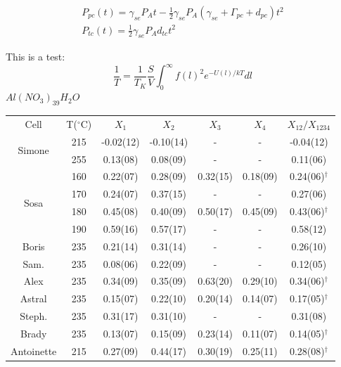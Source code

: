 \documentclass[pdftex,letterpaper,12pt]{report}
\begin{document}
	
\begin{subequations}\label{InitialSpinup}
	\begin{gather}
	P_{pc}(t)=\gamma_{se}P_{A}t-\frac{1}{2}\gamma_{se}P_{A}(\gamma_{se}+\Gamma_{pc}+d_{pc})t^{2}\\
	P_{tc}(t)=\frac{1}{2}\gamma_{se}P_{A}d_{tc}t^{2}
	\end{gather}
\end{subequations}

This is a test:
\begin{equation}
\frac{1}{T}=\frac{1}{T_K}\frac{S}{V}\int_{0}^{\infty} f\left(l\right)^2 e^{-U\left(l\right)/kT}dl
\end{equation}
$Al(NO_3)_39H_2O$

\begin{table}\scriptsize
	\captionsetup{font=scriptsize}
	\begin{center}
		\def\arraystretch{0.75}
		\setlength\tabcolsep{1pt}
		\begin{tabular}{|c|c|cccc|c|}
			\hline
			Cell & T($^\circ$C) & $X_1$ & $X_2$ & $X_3$ & $X_4$ & $X_{12}/X_{1234}$\\ 
			\multirow{2}{*}{Simone} & 215 & -0.02(12) & -0.10(14) & - & - & -0.04(12) \\
			& 255 & 0.13(08) & 0.08(09) & - & - & 0.11(06) \\
			\hline
			\multirow{4}{*}{Sosa} & 160 & 0.22(07) & 0.28(09) & 0.32(15) & 0.18(09) & 0.24(06)$^\dagger$ \\
			& 170 & 0.24(07) & 0.37(15) & - & - & 0.27(06)\\
			& 180 & 0.45(08) & 0.40(09) & 0.50(17) & 0.45(09) & 0.43(06)$^\dagger$ \\
			& 190 & 0.59(16) & 0.57(17) & - & - & 0.58(12) \\
			\hline
			\hline
			Boris & 235 & 0.21(14) & 0.31(14) & - & - & 0.26(10)\\
			\hline
			Sam. & 235 & 0.08(06) & 0.22(09) & - & - & 0.12(05) \\
			\hline
			Alex & 235 & 0.34(09) & 0.35(09) & 0.63(20) & 0.29(10) & 0.34(06)$^\dagger$\\
			\hline
			Astral & 235 & 0.15(07) & 0.22(10) & 0.20(14) & 0.14(07) & 0.17(05)$^\dagger$\\
			\hline
			Steph. & 235 & 0.31(17) & 0.31(10) & - & - & 0.31(08)\\
			\hline
			Brady & 235 & 0.13(07) & 0.15(09) & 0.23(14) & 0.11(07) & 0.14(05)$^\dagger$\\
			\hline
			\multirow{3}{*}{Antoinette} & 215 & 0.27(09) & 0.44(17) & 0.30(19) & 0.25(11) & 0.28(08)$^\dagger$\\

\end{tabular}
\end{center}
\end{table}
\end{document}
